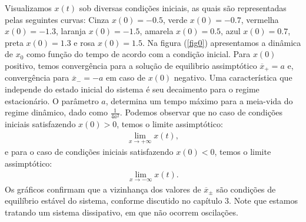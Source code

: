 Visualizamos $x(t)$ sob diversas condições iniciais, as quais são representadas pelas seguintes curvas: Cinza $x(0) = -0.5$,  verde $x(0) = -0.7$, vermelha $x(0) = -1.3$, laranja $x(0) = -1.5$, amarela $x(0) = 0.5$, azul $x(0) = 0.7$, preta $x(0) = 1.3$ e rosa $x(0) = 1.5$. Na figura (\ref{fig0}) apresentamos a dinâmica de $x_{0}$ como função do tempo de acordo com a condição inicial. Para $x(0)$ positivo, temos convergência para a solução de equilibrio assimptótico $\overline{x}_{+} = a$ e, convergência para $\overline{x}_{-} = -a$ em caso de $x(0)$ negativo. Uma característica que independe do estado inicial do sistema é seu decaimento para o regime estacionário. O parâmetro $a$, determina um tempo máximo para a meia-vida do regime dinâmico, dado como $\frac{1}{4a^{2}}$. Podemos observar que no caso de condições iniciais satisfazendo $x(0) > 0$, temos o limite assimptótico:
\begin{eqnarray}
\lim_{x \rightarrow +\infty} x(t) ,
\end{eqnarray}
e para o caso de condições iniciais satisfazendo $x(0) < 0$, temos o limite assimptótico:
\begin{eqnarray}
\lim_{x \rightarrow -\infty} x(t) .
\end{eqnarray}
Os gráficos confirmam que a vizinhança dos valores de $\overline{x}_{\pm}$ são condições de equilíbrio estável do sistema, conforme discutido no capítulo 3. Note que estamos tratando um sistema dissipativo, em que não ocorrem oscilações.

